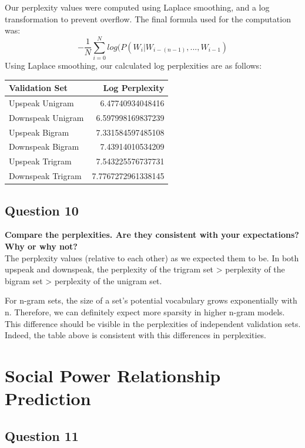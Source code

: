 \documentclass{article} %
\begin{document}
Our perplexity values were computed using Laplace smoothing, and a log transformation to prevent overflow. The final formula used for the computation was:
$$
- \frac{1}{N} \sum\limits_{i = 0}^N log(P(W_i|W_{i - (n-1)},...,W_{i-1})
$$
Using Laplace smoothing, our calculated log perplexities are as follows: \\

\begin{center}
\begin{tabular}{ l | r}
	\hline
		Validation Set & Log Perplexity \\
	\hline
		Upspeak Unigram & 6.47740934048416 \\
		Downspeak Unigram & 6.597998169837239 \\
		Upspeak Bigram & 7.331584597485108 \\
		Downspeak Bigram & 7.43914010534209 \\
		Upspeak Trigram & 7.543225576737731 \\
		Downspeak Trigram & 7.7767272961338145 \\
	\hline
\end{tabular}
\end{center}

\subsection*{Question 10}

\textbf{Compare the perplexities. Are they consistent with your expectations? Why or why not?}
\\

The perplexity values (relative to each other) as we expected them to be. In both upspeak and downspeak, the perplexity of the trigram set > perplexity of the bigram set > perplexity of the unigram set.

For n-gram sets, the size of a set's potential vocabulary grows exponentially with n. Therefore, we can definitely expect more sparsity in higher n-gram models. This difference should be visible in the perplexities of independent validation sets. Indeed, the table above is consistent with this differences in perplexities.


\section{Social Power Relationship Prediction}


\subsection*{Question 11}
\end{document}
